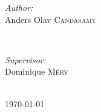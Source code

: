\documentclass[12pt]{article}
\begin{document}
\begin{titlepage}
\begin{minipage}{0.4\textwidth}
\begin{flushleft} \large
\emph{Author:}\\
Anders Olav \textsc{Candasamy} %
\end{flushleft}
\end{minipage}
~
\begin{minipage}{0.4\textwidth}
\begin{flushright} \large
\emph{Supervisor:} \\
Dominique \textsc{M\'{e}ry} %

\end{flushright}
\end{minipage}\\[4cm]



{\large \today}\\[3cm] %


 

\vfill %
\end{titlepage}
\clearpage

%









\end{document}
